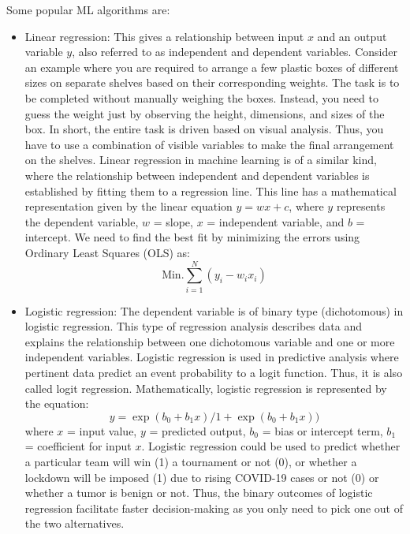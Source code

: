 \documentclass[11pt]{article}
\begin{document}
	
Some popular ML algorithms are: 

\begin{itemize}
\item Linear regression: This gives a relationship between input $x$ and an output variable $y$, also referred to as independent and dependent variables. 
Consider an example where you are required to arrange a few plastic boxes of different sizes on separate shelves based on their corresponding weights.
The task is to be completed without manually weighing the boxes. Instead, you need to guess the weight just by observing the height, dimensions, and sizes of the box. 
In short, the entire task is driven based on visual analysis. Thus, you have to use a combination of visible variables to make the 
final arrangement on the shelves. Linear regression in machine learning is of a similar kind, where the relationship between independent and dependent variables is established 
by fitting them to a regression line. This line has a mathematical representation given by the linear equation $y = wx + c$, where $y$ represents the dependent variable, 
$w$ = slope, $x$ = independent variable, and $b$ = intercept. We need to find the best fit by minimizing the errors using Ordinary Least Squares (OLS) as:
\begin{equation}
\text{Min.} \sum_{i=1}^{N} (y_{i} - w_{i} x_{i})
\end{equation}
\item Logistic regression: The dependent variable is of binary type (dichotomous) in logistic regression. This type of regression analysis describes data and explains the relationship between one dichotomous variable and one or more independent variables.
Logistic regression is used in predictive analysis where pertinent data predict an event probability to a logit function. Thus, it is also called logit regression.
Mathematically, logistic regression is represented by the equation:
\begin{equation}
y = \exp(b_{0} + b_{1}x)/1 + \exp(b_{0} + b_{1}x))
\end{equation}
where $x$ = input value, $y$ = predicted output, $b_0$ = bias or intercept term, $b_1$ = coefficient for input $x$.
Logistic regression could be used to predict whether a particular team will win (1) a tournament or not (0), 
or whether a lockdown will be imposed (1) due to rising COVID-19 cases or not (0) or whether a tumor is benign or not. 
Thus, the binary outcomes of logistic regression facilitate faster decision-making as you only need to pick one out of the two alternatives.

\end{itemize}
\end{document}
